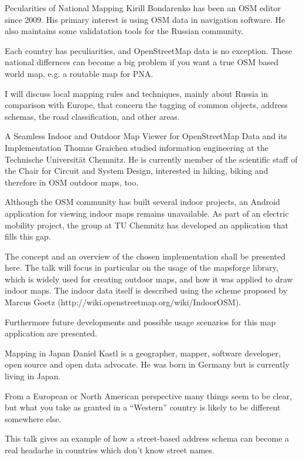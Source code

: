 %
{Pecularities of National Mapping}%
{Kirill Bondarenko has been an OSM editor since 2009. His primary interest is using OSM data in navigation software. He also maintains some validatation tools for the Russian community.}%
{Each country has peculiarities, and OpenStreetMap data is no exception. These national differnces can become a big problem  if you want a true OSM based world map, e.g. a routable map for PNA.

I will discuss local mapping rules and techniques, mainly about Russia in comparison with Europe, that concern the tagging of common objects, address schemas, the road classification, and other areas.}


%
{A Seamless Indoor and Outdoor Map Viewer for OpenStreetMap Data and its Implementation}%
{Thomas Graichen studied information engineering at the Technische Universität Chemnitz. He is currently member of the scientific staff of the Chair for Circuit and System Design, interested in hiking, biking and therefore in OSM outdoor maps, too.}%
{Although the OSM community has built several indoor projects, an Android application for viewing indoor maps remains unavailable. As part of an electric mobility project, the group at TU Chemnitz has developed an application that fills this gap.

The concept and an overview of the chosen implementation shall be presented here. The talk will focus in particular on the usage of the mapsforge library, which is widely used for creating outdoor maps, and how it was applied to draw indoor maps. The indoor data itself is described using the scheme proposed by Marcus Goetz (http://wiki.openstreetmap.org/wiki/IndoorOSM).

Furthermore future developments and possible usage scenarios for this map application are presented.}

%
{Mapping in Japan}%
{Daniel Kastl is a geographer, mapper, software developer, open source and open data advocate. He was born in Germany but is currently living in Japan.}%
{From a European or North American perspective many things seem to be clear, but what you take as granted in a ``Western'' country is likely to be different somewhere else.

This talk gives an example of how a street-based address schema can become a real headache in countries which don't know street names.}

